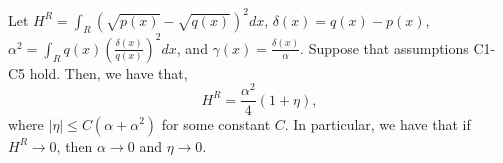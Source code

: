 \documentclass{article}
\newcommand{\bin}{\text{bin}}
\begin{document}




\begin{lemma}
\label{prop:continuous_hellinger_chi_square}
Let $H^R = \int_R (\sqrt{p(x)} - \sqrt{q(x)})^2 dx$, $\delta(x) = q(x) - p(x)$, $ \alpha^2 =  \int_R q(x) \left( \frac{\delta(x)}{q(x)} \right)^2 dx$, and $\gamma(x) = \frac{\delta(x)}{\alpha}$. Suppose that assumptions C1-C5 hold. Then, we have that, 
\[
H^R = \frac{\alpha^2}{4}(1 + \eta ),
\]
where $|\eta| \leq C(\alpha + \alpha^2)$ for some constant $C$. In particular, we have that if $H^R \rightarrow 0$, then $\alpha \rightarrow 0$ and $\eta \rightarrow 0$. 
\end{lemma}
\end{document}
